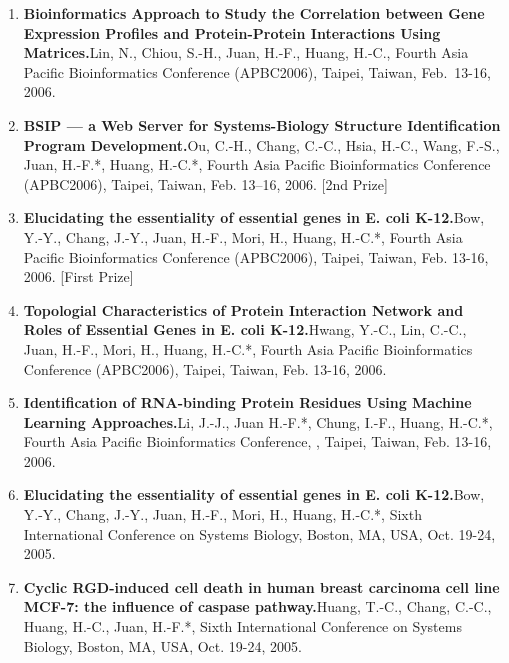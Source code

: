 \documentclass[10pt,a4paper]{article}
\def\newpub#1#2#3{{\boldmath \bf #2.}\newline #1, #3.}
\begin{document}
\begin{enumerate}

\item
\newpub
{Lin, N., Chiou, S.-H., Juan, H.-F., Huang, H.-C.}
{Bioinformatics Approach to Study the Correlation between Gene Expression Profiles and Protein-Protein Interactions Using Matrices}
{Fourth Asia Pacific Bioinformatics Conference (APBC2006), Taipei, Taiwan, Feb.\ 13-16, 2006}

\item
\newpub
{Ou, C.-H., Chang, C.-C., Hsia, H.-C., Wang, F.-S., Juan, H.-F.*, Huang, H.-C.*}
{BSIP --- a Web Server for Systems-Biology Structure Identification Program Development}
{Fourth Asia Pacific Bioinformatics Conference (APBC2006), Taipei, Taiwan, Feb. 13--16, 2006}
[2nd Prize]

\item
\newpub
{Bow, Y.-Y., Chang, J.-Y., Juan, H.-F., Mori, H., Huang, H.-C.*}
{Elucidating the essentiality of essential genes in E. coli K-12}
{Fourth Asia Pacific Bioinformatics Conference (APBC2006), Taipei, Taiwan, Feb. 13-16, 2006}
[First Prize]

\item
\newpub
{Hwang, Y.-C., Lin, C.-C., Juan, H.-F., Mori, H., Huang, H.-C.*}
{Topologial Characteristics of Protein Interaction Network and Roles of Essential Genes in E. coli K-12}
{Fourth Asia Pacific Bioinformatics Conference (APBC2006), Taipei, Taiwan, Feb. 13-16, 2006}

\item
\newpub
{Li, J.-J., Juan H.-F.*, Chung, I.-F., Huang, H.-C.*}
{Identification of RNA-binding Protein Residues Using Machine Learning Approaches}
{Fourth Asia Pacific Bioinformatics Conference, , Taipei, Taiwan, Feb. 13-16, 2006}

\item
\newpub
{Bow, Y.-Y., Chang, J.-Y., Juan, H.-F., Mori, H., Huang, H.-C.*}
{Elucidating the essentiality of essential genes in E. coli K-12}
{Sixth International Conference on Systems Biology, Boston, MA, USA, Oct. 19-24, 2005}

\item
\newpub
{Huang, T.-C., Chang, C.-C., Huang, H.-C., Juan, H.-F.*}
{Cyclic RGD-induced cell death in human breast carcinoma cell line MCF-7: the influence of caspase pathway}
{Sixth International Conference on Systems Biology, Boston, MA, USA, Oct. 19-24, 2005}


\end{enumerate}
\end{document}
